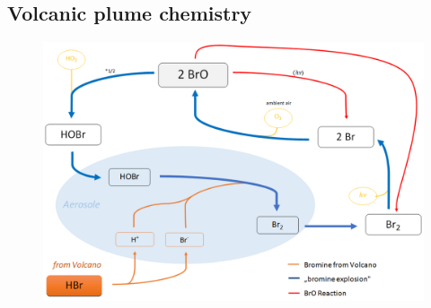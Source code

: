 \documentclass  [
  paper    = a4,
  BCOR     = 10mm,
  twoside,
  fontsize = 12pt,
  fleqn,
  toc      = bibnumbered,
  toc      = listofnumbered,
  numbers  = noendperiod,
  headings = normal,
  listof   = leveldown,
  version  = 3.03
]                                       {scrreprt}
\begin{document}
{	\subsection{Volcanic plume chemistry}
	\begin{figure}
		\centering
		\includegraphics[width=0.7\linewidth]{Bilder/Simon/Bilder_Tung/BrO_Explosion}
		\caption{}
		\label{fig:broexplosion}
	\end{figure}
}
\end{document}
